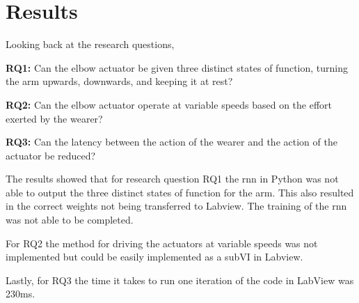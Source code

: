 \section{Results}
\label{section:results}

%
%
%
Looking back at the research questions,

\textbf{RQ1:} Can the elbow actuator be given three distinct states of function, turning the arm upwards, downwards, and keeping it at rest?

\textbf{RQ2:} Can the elbow actuator operate at variable speeds based on the effort exerted by the wearer?

\textbf{RQ3:} Can the latency between the action of the wearer and the action of the actuator be reduced?

The results showed that for research question RQ1 the \acrshort{rnn} in Python was not able to output the three distinct states of function for the arm. This also resulted in the correct weights not being transferred to Labview. 
The training of the \acrshort{rnn} was not able to be completed. 

For RQ2 the method for driving the actuators at variable speeds was not implemented but could be easily implemented as a subVI in Labview.  

Lastly, for RQ3 the time it takes to run one iteration of the code in LabView was 230ms.